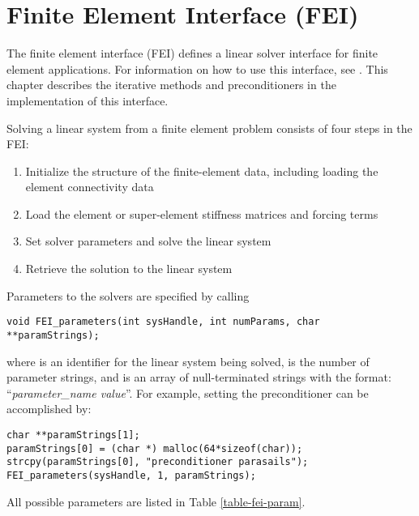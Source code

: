 
\chapter{Finite Element Interface (FEI)}
\label{ch-FEI}

The finite element interface (FEI) defines a linear solver interface 
for finite element applications.  For information on how to use this
interface, see \cite{FEI-ref}.  
This chapter describes the iterative methods and 
preconditioners in the \hypre{} implementation
of this interface.

Solving a linear system from a finite element problem consists of
four steps in the FEI:
\begin{enumerate}
\item Initialize the structure of the finite-element data,
      including loading the element connectivity data
\item Load the element or super-element stiffness matrices and forcing terms
\item Set solver parameters and solve the linear system
\item Retrieve the solution to the linear system
\end{enumerate}

Parameters to the \hypre{} solvers are specified by calling
\begin{display}
\begin{verbatim}
void FEI_parameters(int sysHandle, int numParams, char **paramStrings);
\end{verbatim}
\end{display}
where  is an identifier for the linear system being solved,
 is the number of parameter strings, and  is
an array of null-terminated strings with the format: 
``{\em parameter\_name value}''.
For example, setting the preconditioner can be accomplished by:
\begin{display}
\begin{verbatim}
char **paramStrings[1];
paramStrings[0] = (char *) malloc(64*sizeof(char));
strcpy(paramStrings[0], "preconditioner parasails");
FEI_parameters(sysHandle, 1, paramStrings);
\end{verbatim}
\end{display}
All possible parameters are listed in Table \ref{table-fei-param}.


